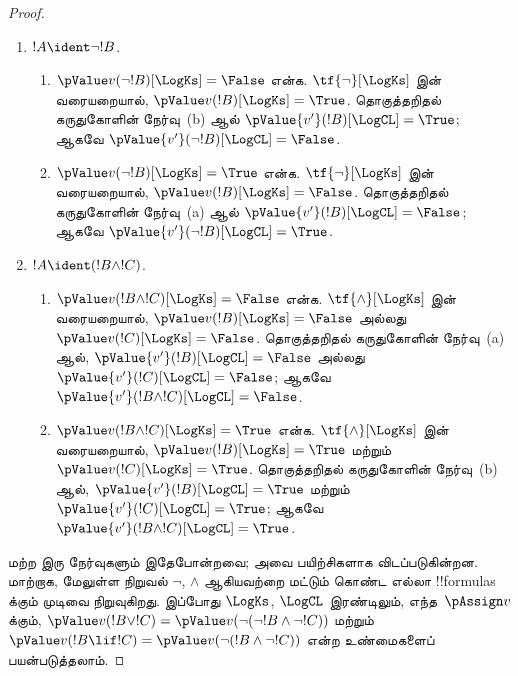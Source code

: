 \documentclass[../../../include/open-logic-section]{subfiles}
\begin{document}
\begin{proof}
\begin{enumerate}
    தொகுத்தறிதல் படிக்கு, பின்வரும் நேர்வுகளைக் கருதுக:
    \item $!A \ident \lnot !B$.
    \begin{enumerate}
      \item $\pValue v(\lnot!B)[\LogKs] = \False$ என்க.
      $\tf{\lnot}[\LogKs]$ இன் வரையறையால்,
      $\pValue v(!B)[\LogKs]  = \True$. தொகுத்தறிதல் கருதுகோளின்
      நேர்வு~(b) ஆல் $\pValue {v'}(!B)[\LogCL]  = \True$; ஆகவே
      $\pValue {v'}(\lnot !B)[\LogCL] = \False$.
      \item $\pValue v(\lnot!B)[\LogKs] = \True$ என்க.
      $\tf{\lnot}[\LogKs]$ இன் வரையறையால்,
      $\pValue v(!B)[\LogKs]  = \False$. தொகுத்தறிதல் கருதுகோளின்
      நேர்வு~(a) ஆல் $\pValue {v'}(!B)[\LogCL]  = \False$; ஆகவே
      $\pValue {v'}(\lnot !B)[\LogCL] = \True$.
    \end{enumerate}

    \item $!A \ident (!B \land !C)$.
    \begin{enumerate}
      \item $\pValue v(!B \land !C)[\LogKs] = \False$ என்க.
      $\tf{\land}[\LogKs]$ இன் வரையறையால்,
      $\pValue v(!B)[\LogKs]  = \False$ அல்லது
      $\pValue v(!C)[\LogKs]  = \False$. தொகுத்தறிதல் கருதுகோளின்
      நேர்வு~(a) ஆல், $\pValue {v'}(!B)[\LogCL]  = \False$ அல்லது
      $\pValue {v'}(!C)[\LogCL]  = \False$; ஆகவே
      $\pValue {v'}(!B \land !C)[\LogCL] = \False$.
      \item $\pValue v(!B \land !C)[\LogKs] = \True$ என்க.
      $\tf{\land}[\LogKs]$ இன் வரையறையால்,
      $\pValue v(!B)[\LogKs]  = \True$ மற்றும்
      $\pValue v(!C)[\LogKs]  = \True$. தொகுத்தறிதல் கருதுகோளின்
      நேர்வு~(b) ஆல், $\pValue {v'}(!B)[\LogCL]  = \True$ மற்றும்
      $\pValue {v'}(!C)[\LogCL]  = \True$; ஆகவே
      $\pValue {v'}(!B \land !C)[\LogCL] = \True$.
    \end{enumerate}
  \end{enumerate}

  மற்ற இரு நேர்வுகளும் இதேபோன்றவை; அவை பயிற்சிகளாக விடப்படுகின்றன.
  மாற்றாக, மேலுள்ள நிறுவல் $\lnot$, $\land$ ஆகியவற்றை மட்டும் கொண்ட எல்லா
  !!{formula}s க்கும் முடிவை நிறுவுகிறது. இப்போது $\LogKs$, $\LogCL$
  இரண்டிலும், எந்த~$\pAssign v$ க்கும்,
  $\pValue v(!B \lor !C) = \pValue v(\lnot(\lnot!B \land \lnot !C))$
  மற்றும் $\pValue v(!B \lif !C) = \pValue v(\lnot(!B \land \lnot !C))$
  என்ற உண்மைகளைப் பயன்படுத்தலாம்.
\end{proof}
\end{document}
